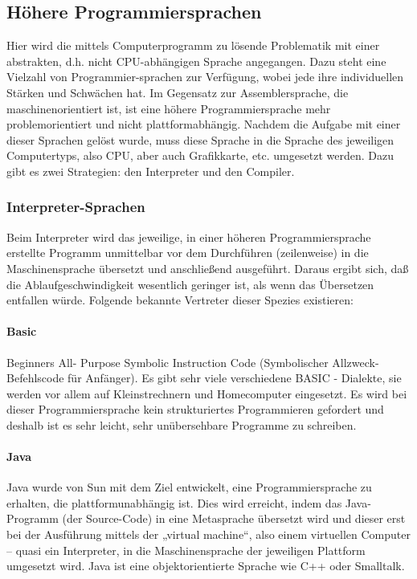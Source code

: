 \subsection{Höhere Programmiersprachen}
Hier wird die mittels Computerprogramm zu lösende Problematik mit einer abstrakten, d.h. nicht CPU-abhängigen Sprache angegangen. Dazu steht eine Vielzahl von Programmier-sprachen zur Verfügung, wobei jede ihre individuellen Stärken und Schwächen hat. 
Im Gegensatz zur Assemblersprache, die maschinenorientiert ist, ist eine höhere Programmiersprache mehr problemorientiert und nicht plattformabhängig.
Nachdem die Aufgabe mit einer dieser Sprachen gelöst wurde, muss diese Sprache in die Sprache des jeweiligen Computertyps, also CPU, aber auch Grafikkarte, etc. umgesetzt werden. Dazu gibt es zwei Strategien: den Interpreter und den Compiler.

\subsubsection{Interpreter-Sprachen}
Beim Interpreter wird das jeweilige, in einer höheren Programmiersprache erstellte Programm unmittelbar vor dem Durchführen (zeilenweise) in die Maschinensprache übersetzt und anschließend ausgeführt. Daraus ergibt sich, daß die Ablaufgeschwindigkeit wesentlich geringer ist, als wenn das Übersetzen entfallen würde.
Folgende bekannte Vertreter dieser Spezies existieren:

\paragraph{Basic}
Beginners All- Purpose Symbolic Instruction Code (Symbolischer Allzweck-Befehlscode für Anfänger). Es gibt sehr viele verschiedene BASIC - Dialekte, sie werden vor allem auf Kleinstrechnern und Homecomputer eingesetzt. Es wird bei dieser Programmiersprache kein strukturiertes Programmieren gefordert und deshalb ist es sehr leicht, sehr unübersehbare Programme zu schreiben.

\paragraph{Java}
Java wurde von Sun mit dem Ziel entwickelt, eine Programmiersprache zu erhalten, die plattformunabhängig ist. Dies wird erreicht, indem das Java-Programm (der Source-Code) in eine Metasprache übersetzt wird und dieser erst bei der Ausführung mittels der „virtual machine“, also einem virtuellen Computer – quasi ein Interpreter, in die Maschinensprache der jeweiligen Plattform umgesetzt wird. Java ist eine objektorientierte Sprache wie C++ oder Smalltalk.

